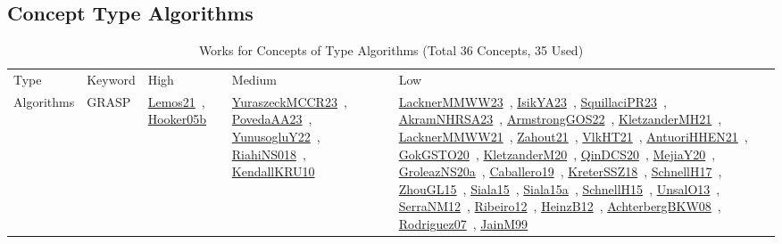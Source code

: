 \clearpage
\subsection{Concept Type Algorithms}
\label{sec:Algorithms}
\label{Algorithms}
{\scriptsize
\begin{longtable}{lp{3cm}>{\raggedright\arraybackslash}p{6cm}>{\raggedright\arraybackslash}p{6cm}>{\raggedright\arraybackslash}p{8cm}}
\rowcolor{white}\caption{Works for Concepts of Type Algorithms (Total 36 Concepts, 35 Used)}\\ \toprule
\rowcolor{white}Type & Keyword & High & Medium & Low\\ \midrule\endhead
\bottomrule
\endfoot
\index{GRASP}\index{Algorithms!GRASP}Algorithms & GRASP & \href{../works/Lemos21.pdf}{Lemos21}~\cite{Lemos21}, \href{../works/Hooker05b.pdf}{Hooker05b}~\cite{Hooker05b} & \href{../works/YuraszeckMCCR23.pdf}{YuraszeckMCCR23}~\cite{YuraszeckMCCR23}, \href{../works/PovedaAA23.pdf}{PovedaAA23}~\cite{PovedaAA23}, \href{../works/YunusogluY22.pdf}{YunusogluY22}~\cite{YunusogluY22}, \href{../works/RiahiNS018.pdf}{RiahiNS018}~\cite{RiahiNS018}, \href{../works/KendallKRU10.pdf}{KendallKRU10}~\cite{KendallKRU10} & \href{../works/LacknerMMWW23.pdf}{LacknerMMWW23}~\cite{LacknerMMWW23}, \href{../works/IsikYA23.pdf}{IsikYA23}~\cite{IsikYA23}, \href{../works/SquillaciPR23.pdf}{SquillaciPR23}~\cite{SquillaciPR23}, \href{../works/AkramNHRSA23.pdf}{AkramNHRSA23}~\cite{AkramNHRSA23}, \href{../works/ArmstrongGOS22.pdf}{ArmstrongGOS22}~\cite{ArmstrongGOS22}, \href{../works/KletzanderMH21.pdf}{KletzanderMH21}~\cite{KletzanderMH21}, \href{../works/LacknerMMWW21.pdf}{LacknerMMWW21}~\cite{LacknerMMWW21}, \href{../works/Zahout21.pdf}{Zahout21}~\cite{Zahout21}, \href{../works/VlkHT21.pdf}{VlkHT21}~\cite{VlkHT21}, \href{../works/AntuoriHHEN21.pdf}{AntuoriHHEN21}~\cite{AntuoriHHEN21}, \href{../works/GokGSTO20.pdf}{GokGSTO20}~\cite{GokGSTO20}, \href{../works/KletzanderM20.pdf}{KletzanderM20}~\cite{KletzanderM20}, \href{../works/QinDCS20.pdf}{QinDCS20}~\cite{QinDCS20}, \href{../works/MejiaY20.pdf}{MejiaY20}~\cite{MejiaY20}, \href{../works/GroleazNS20a.pdf}{GroleazNS20a}~\cite{GroleazNS20a}, \href{../works/Caballero19.pdf}{Caballero19}~\cite{Caballero19}, \href{../works/KreterSSZ18.pdf}{KreterSSZ18}~\cite{KreterSSZ18}, \href{../works/SchnellH17.pdf}{SchnellH17}~\cite{SchnellH17}, \href{../works/ZhouGL15.pdf}{ZhouGL15}~\cite{ZhouGL15}, \href{../works/Siala15.pdf}{Siala15}~\cite{Siala15}, \href{../works/Siala15a.pdf}{Siala15a}~\cite{Siala15a}, \href{../works/SchnellH15.pdf}{SchnellH15}~\cite{SchnellH15}, \href{../works/UnsalO13.pdf}{UnsalO13}~\cite{UnsalO13}, \href{../works/SerraNM12.pdf}{SerraNM12}~\cite{SerraNM12}, \href{../works/Ribeiro12.pdf}{Ribeiro12}~\cite{Ribeiro12}, \href{../works/HeinzB12.pdf}{HeinzB12}~\cite{HeinzB12}, \href{../works/AchterbergBKW08.pdf}{AchterbergBKW08}~\cite{AchterbergBKW08}, \href{../works/Rodriguez07.pdf}{Rodriguez07}~\cite{Rodriguez07}, \href{../works/JainM99.pdf}{JainM99}~\cite{JainM99}\\

\end{longtable}}
